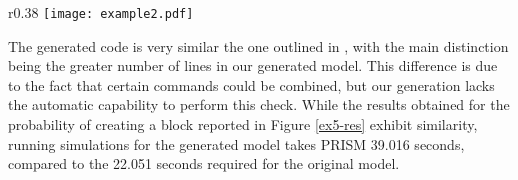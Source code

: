 \begin{comment}
   [NGRDF] (Network=0)  $\rightarrow$  
   	1 : (set2'=addBlockSet(set2,b2))$\&$(set3'=addBlockSet(set3,b3))$\&$(set4'=addBlockSet(set4,b4))$\&$(set5'=addBlockSet(set5,b5))$\&$(Network'=0); 
   [PCRLD] (Network=0)  $\rightarrow$  
   	1 : (set2'=addBlockSet(set2,b2))$\&$(set3'=addBlockSet(set3,b3))$\&$(set4'=addBlockSet(set4,b4))$\&$(set5'=addBlockSet(set5,b5))$\&$(Network'=0); 
   [MDDCF] (Network=0)  $\rightarrow$  1 : (set1' = removeBlock(set1,b1))$\&$(Network'=0); 
   [IQVPA] (Network=0)  $\rightarrow$  1 : (set1' = removeBlock(set1,b1))$\&$(Network'=0); 
   $\ldots$
endmodule

module Vote_Manager
   Vote_Manager : [0..1] init 0;
   epoch : [0..10] init 0;
   Votes : hash[];  
   tot_stake : [0..120000] init 50; 
   stake1 : [0..N] init 10; 
   stake2 : [0..N] init 10; 
   stake3 : [0..N] init 10; 
   stake4 : [0..N] init 10; 
   stake5 : [0..N] init 10; 

   [VSJBE] (Vote_Manager=0)  $\rightarrow$  
   	1 : (Votes'=addVote(Votes,b1,stake1))$\&$(Vote_Manager'=0); 
   $\ldots$
endmodule

\end{lstlisting}
\end{comment}

\begin{wrapfigure}{r}{0.38\textwidth}
	\vspace{-0.75cm}
	\centering
	\texttt{[image: example2.pdf]}	
	\vspace{-0.35cm}
	\caption{}
	\label{ex5-res}
	\vspace{-0.75cm}
	\end{wrapfigure}
        The generated code is very similar the one outlined in
        \cite{DBLP:journals/distribledger/GallettaLMV23}, with the
        main distinction being the greater number of lines in our
        generated model.  This difference is due to the fact that
        certain commands could be combined, but our generation lacks
        the automatic capability to perform this check. While the
        results obtained for the probability of creating a block
        reported in Figure \ref{ex5-res} exhibit similarity, running
        simulations for the generated model takes PRISM 39.016
        seconds, compared to the 22.051 seconds required for the
        original model.


